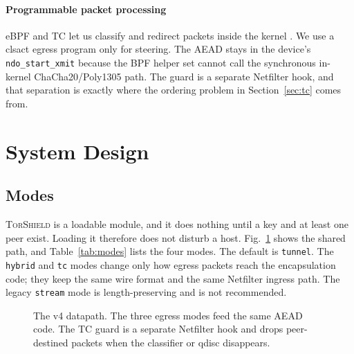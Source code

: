 \documentclass[conference]{IEEEtran}
\newcommand{\sys}{\textsc{TorShield}}
\newcommand{\code}[1]{\texttt{#1}}
\begin{document}
\paragraph{Programmable packet processing}
eBPF and TC let us classify and redirect packets inside the kernel \cite{hoiland2018xdp}. We use a clsact egress program only for steering. The AEAD stays in the device's \code{ndo\_start\_xmit} because the BPF helper set cannot call the synchronous in-kernel ChaCha20/Poly1305 path. The guard is a separate Netfilter hook, and that separation is exactly where the ordering problem in Section~\ref{sec:tc} comes from.

\section{System Design}
\label{sec:design}

\subsection{Modes}
\sys{} is a loadable module, and it does nothing until a key and at least one peer exist. Loading it therefore does not disturb a host. Fig.~\ref{fig:datapath} shows the shared path, and Table~\ref{tab:modes} lists the four modes. The default is \code{tunnel}. The \code{hybrid} and \code{tc} modes change only how egress packets reach the encapsulation code; they keep the same wire format and the same Netfilter ingress path. The legacy \code{stream} mode is length-preserving and is not recommended.

\begin{figure}[t]
\centering
{}
\caption{The v4 datapath. The three egress modes feed the same AEAD code. The TC guard is a separate Netfilter hook and drops peer-destined packets when the classifier or qdisc disappears.}
\label{fig:datapath}
\end{figure}
\end{document}
